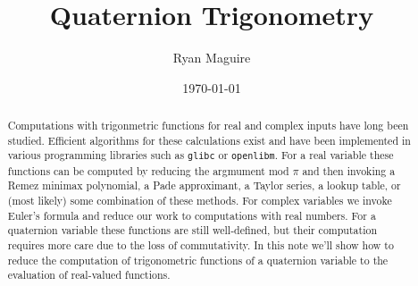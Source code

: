 \documentclass{article}
\title{Quaternion Trigonometry}
\author{Ryan Maguire}
\date{\today}
\begin{document}
    \maketitle
    \begin{abstract}
        Computations with trigonmetric functions for real and complex inputs
        have long been studied. Efficient algorithms for these calculations
        exist and have been implemented in various programming libraries such
        as \texttt{glibc} or \texttt{openlibm}.
        For a real variable these functions can be computed by reducing the
        argmument mod $\pi$ and then invoking a Remez minimax polynomial, a
        Pade approximant, a Taylor series, a lookup table, or (most likely)
        some combination of these methods. For complex variables we invoke
        Euler's formula and reduce our work to computations with real numbers.
        For a quaternion variable these functions are still well-defined, but
        their computation requires more care due to the loss of commutativity.
        In this note we'll show how to reduce the computation of trigonometric
        functions of a quaternion variable to the evaluation of real-valued
        functions.
    \end{abstract}
    \tableofcontents
\end{document}
